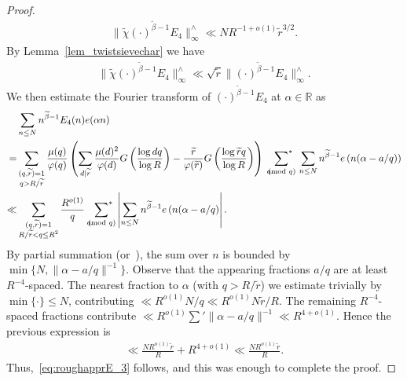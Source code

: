 \documentclass[12pt]{amsart}
\theoremstyle{definition}
\theoremstyle{remark}
\numberwithin{equation}{section}
\newcommand{\asum}{\sideset{}{^{\ast}}\sum}
\newcommand{\1}{\mathbf{1}}
\newcommand{\R}{{\mathbb R}}
\let\oldpmod\pmod
\renewcommand{\pmod}[1]{\hspace{-0.12cm}\oldpmod {#1}}
\begin{document}
\begin{proof}
    \begin{align}\label{eq:roughapprE_3}
        \|\widetilde{\chi} (\cdot)^{\widetilde{\beta}-1}E_4 \|^{\wedge}_\infty  \ll  N R^{-1+o(1)} \widetilde{r}^{3/2}.
    \end{align}
     By Lemma~\ref{lem_twistsievechar} we have
    \begin{align*}
        \|\widetilde{\chi} (\cdot)^{\widetilde{\beta}-1}E_4 \|^{\wedge}_\infty \ll \sqrt{\widetilde{r}}\|(\cdot)^{\widetilde{\beta}-1}E_4  \|^{\wedge}_\infty.
    \end{align*}    We then estimate the Fourier transform of $(\cdot)^{\widetilde{\beta}-1}E_4$ at $\alpha \in \mathbb{R}$ as
    \begin{align*}
        &\sum_{n\leq N} n^{\widetilde{\beta}-1} E_4(n)e(\alpha n)\\
        =& \sum_{\substack{(q,\widetilde{r})=1\\ q>R/\widetilde{r}}} \frac{\mu(q)}{\varphi(q)}\left(\sum_{d\mid \widetilde{r}} \frac{\mu(d)^2}{\varphi(d)}G\left(\frac{\log dq}{\log R}\right)- \frac{\widetilde{r}}{\varphi(\widetilde{r})} G\left(\frac{\log \widetilde{r}q}{\log R}\right)\right)\,\,\,\asum_{a\pmod q}\,\sum_{n\leq N}n^{\widetilde{\beta}-1}e\left(n(\alpha-a/q)\right) \\
        \ll & \sum_{\substack{(q,\widetilde{r})=1\\R/\widetilde{r}<q\leq R^2}}\frac{R^{o(1)}}{q} \,\,\,\asum_{a\pmod q} \left| \sum_{n\leq N}n^{\widetilde{\beta}-1}e\left(n(\alpha-a/q\right)\right|.
    \end{align*}
    By partial summation (or~\cite[Proposition 5.3]{green-sarkozy}), the sum over $n$ is bounded by $\min\{N,\|\alpha-a/q\|^{-1}\}$. Observe that the appearing fractions $a/q$ are at least $R^{-4}$-spaced. The nearest fraction to $\alpha$ (with $q>R/\widetilde{r}$) we estimate trivially by $\min\{\cdot\}\le N$, contributing $\ll R^{o(1)}N/q\ll R^{o(1)}N\widetilde{r}/R$. The remaining $R^{-4}$-spaced fractions contribute $\ll R^{o(1)}\sum'\|\alpha-a/q\|^{-1}\ll R^{4+o(1)}$. Hence the previous expression is
    \begin{align*}
        {}\ll{} \frac{N R^{o(1)}\widetilde{r}}{R}+R^{4+o(1)}\ll  \frac{N R^{o(1)}\widetilde{r}}{R}.
    \end{align*}
    Thus,~\eqref{eq:roughapprE_3}  follows, and this was enough to complete the proof.
\end{proof}
\end{document}
